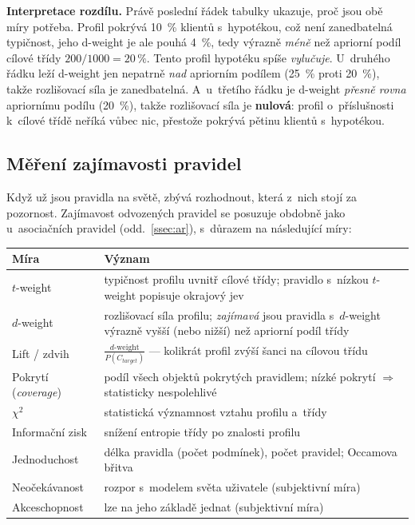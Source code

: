 \documentclass[11pt,a4paper]{article}
\theoremstyle{definition}
\begin{document}
\begin{defbox}
\textbf{Interpretace rozdílu.} Právě poslední řádek tabulky ukazuje, proč jsou obě míry
potřeba. Profil  pokrývá 10~\% klientů s~hypotékou, což
není zanedbatelná typičnost, jeho d-weight je ale pouhá 4~\%, tedy výrazně \emph{méně} než
apriorní podíl cílové třídy $200/1000=20\,\%$. Tento profil hypotéku spíše \emph{vylučuje}.
U~druhého řádku leží d-weight jen nepatrně \emph{nad} apriorním podílem (25~\% proti 20~\%),
takže rozlišovací síla je zanedbatelná. A~u~třetího řádku je d-weight \emph{přesně rovna}
apriornímu podílu (20~\%), takže rozlišovací síla je \textbf{nulová}: profil o~příslušnosti
k~cílové třídě neříká vůbec nic, přestože pokrývá pětinu klientů s~hypotékou.
\end{defbox}

\subsection{Měření zajímavosti pravidel}

Když už jsou pravidla na světě, zbývá rozhodnout, která z~nich stojí za pozornost. Zajímavost
odvozených pravidel se posuzuje obdobně jako u~asociačních pravidel (odd.~\ref{ssec:ar}),
s~důrazem na následující míry:

\begin{center}
\small
\begin{tabular}{@{}lp{11.0cm}@{}}
\toprule
\textbf{Míra} & \textbf{Význam} \\
\midrule
$t$-weight & typičnost profilu uvnitř cílové třídy; pravidlo s~nízkou $t$-weight popisuje
  okrajový jev \\
$d$-weight & rozlišovací síla profilu; \emph{zajímavá} jsou pravidla s~$d$-weight výrazně
  vyšší (nebo nižší) než apriorní podíl třídy \\
Lift / zdvih & $\frac{d\text{-weight}}{P(C_{target})}$ --- kolikrát profil zvýší šanci na
  cílovou třídu \\
Pokrytí (\emph{coverage}) & podíl všech objektů pokrytých pravidlem; nízké pokrytí
  $\Rightarrow$ statisticky nespolehlivé \\
$\chi^2$ & statistická významnost vztahu profilu a~třídy \\
Informační zisk & snížení entropie třídy po znalosti profilu \\
Jednoduchost & délka pravidla (počet podmínek), počet pravidel; Occamova břitva \\
Neočekávanost & rozpor s~modelem světa uživatele (subjektivní míra) \\
Akceschopnost & lze na jeho základě jednat (subjektivní míra) \\
\bottomrule
\end{tabular}
\end{center}
\end{document}
